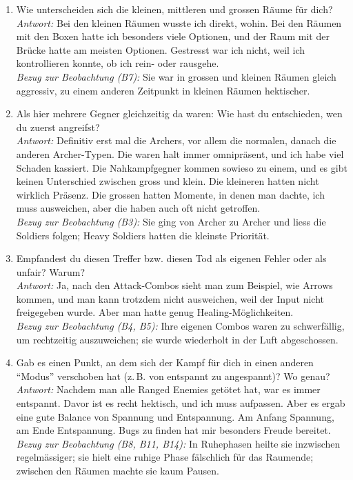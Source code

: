\documentclass[../Main.tex]{subfiles}
\begin{document}
\begin{enumerate}[label=\textbf{I\arabic*}, leftmargin=1.5cm, itemsep=1em]
\item Wie unterscheiden sich die kleinen, mittleren und grossen Räume für dich? \\
\textit{Antwort:} Bei den kleinen Räumen wusste ich direkt, wohin. Bei den Räumen mit den Boxen hatte ich besonders viele Optionen, und der Raum mit der Brücke hatte am meisten Optionen. Gestresst war ich nicht, weil ich kontrollieren konnte, ob ich rein- oder rausgehe. \\
\textit{Bezug zur Beobachtung (B7):} Sie war in grossen und kleinen Räumen gleich aggressiv, zu einem anderen Zeitpunkt in kleinen Räumen hektischer.

\item Als hier mehrere Gegner gleichzeitig da waren: Wie hast du entschieden, wen du zuerst angreifst? \\
\textit{Antwort:} Definitiv erst mal die Archers, vor allem die normalen, danach die anderen Archer-Typen. Die waren halt immer omnipräsent, und ich habe viel Schaden kassiert. Die Nahkampfgegner kommen sowieso zu einem, und es gibt keinen Unterschied zwischen gross und klein. Die kleineren hatten nicht wirklich Präsenz. Die grossen hatten Momente, in denen man dachte, ich muss ausweichen, aber die haben auch oft nicht getroffen. \\
\textit{Bezug zur Beobachtung (B3):} Sie ging von Archer zu Archer und liess die Soldiers folgen; Heavy Soldiers hatten die kleinste Priorität.

\item Empfandest du diesen Treffer bzw. diesen Tod als eigenen Fehler oder als unfair? Warum? \\
\textit{Antwort:} Ja, nach den Attack-Combos sieht man zum Beispiel, wie Arrows kommen, und man kann trotzdem nicht ausweichen, weil der Input nicht freigegeben wurde. Aber man hatte genug Healing-Möglichkeiten. \\
\textit{Bezug zur Beobachtung (B4, B5):} Ihre eigenen Combos waren zu schwerfällig, um rechtzeitig auszuweichen; sie wurde wiederholt in der Luft abgeschossen.

\item Gab es einen Punkt, an dem sich der Kampf für dich in einen anderen \enquote{Modus} verschoben hat (z.\,B. von entspannt zu angespannt)? Wo genau? \\
\textit{Antwort:} Nachdem man alle Ranged Enemies getötet hat, war es immer entspannt. Davor ist es recht hektisch, und ich muss aufpassen. Aber es ergab eine gute Balance von Spannung und Entspannung. Am Anfang Spannung, am Ende Entspannung. Bugs zu finden hat mir besonders Freude bereitet. \\
\textit{Bezug zur Beobachtung (B8, B11, B14):} In Ruhephasen heilte sie inzwischen regelmässiger; sie hielt eine ruhige Phase fälschlich für das Raumende; zwischen den Räumen machte sie kaum Pausen.


\end{enumerate}
\end{document}
